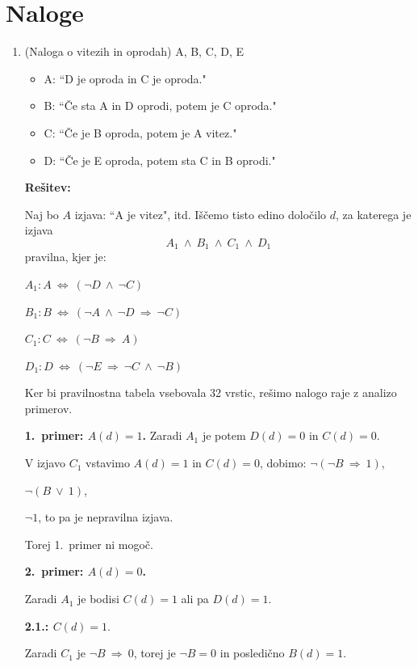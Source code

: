 \documentclass[11pt,paper=b5,footinclude,headinclude]{scrbook} %
\def\ali {{~\vee~}}
\def\inn {{~\wedge~}}
\def\sledi {{~\Rightarrow~}}
\def\cee {{~\Leftrightarrow~}}
\begin{document}
\section{Naloge}
\begin{enumerate}
    \item 
    (Naloga o vitezih in oprodah)
A, B, C, D, E
\begin{itemize}
  \item A: ``D je oproda in C je oproda."
  \item B: ``Če sta A in D oprodi, potem je C oproda."
  \item C: ``Če je B oproda, potem je A vitez."
  \item D: ``Če je E oproda, potem sta C in B oprodi."
\end{itemize}

\medskip
\textbf{Rešitev:}

Naj bo $A$ izjava: ``A je vitez", itd.
Iščemo tisto edino določilo $d$, za katerega je izjava $$A_1\inn B_1\inn C_1\inn D_1$$
pravilna, kjer je:

$A_1: A\cee (\neg D \inn \neg C)$

$B_1: B\cee (\neg A \inn \neg D\sledi \neg C)$

$C_1: C\cee (\neg B \sledi A)$

$D_1: D\cee (\neg E \sledi \neg C \inn \neg B)$


Ker bi pravilnostna tabela vsebovala 32 vrstic, rešimo nalogo
raje z analizo primerov.

\textbf{1.~primer: $A(d) = 1$.}
Zaradi $A_1$ je potem $D(d) = 0$ in $C(d) = 0$.

V izjavo $C_1$ vstavimo $A(d) = 1$ in $C(d) = 0$, dobimo:
$\neg(\neg B\sledi 1)$,

$\neg(B\ali 1)$,

$\neg 1$, to pa je nepravilna izjava.

Torej 1.~primer ni mogoč.
%
%
%
%
%
%

\textbf{2.~primer: $A(d) = 0$.}

Zaradi $A_1$ je bodisi $C(d) = 1$ ali pa $D(d) = 1$.

\textbf{2.1.: $C(d) = 1$}.

Zaradi $C_1$ je $\neg B \sledi 0$, torej je $\neg B = 0$ in posledično $B(d) = 1$.


\end{enumerate}
\end{document}
